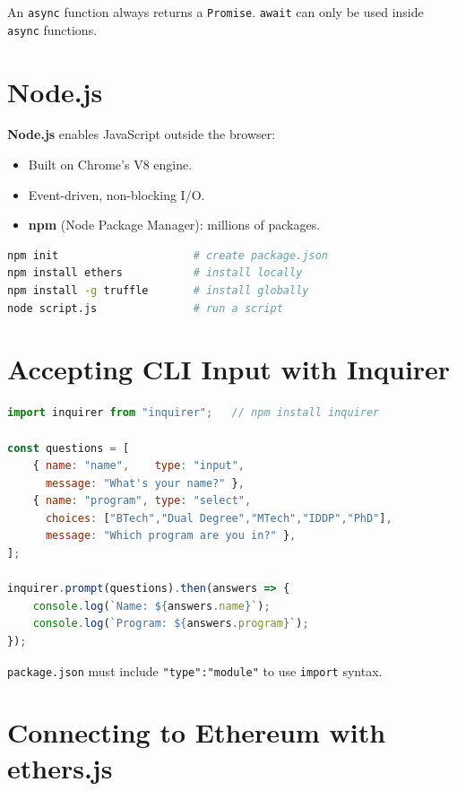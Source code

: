 \documentclass[12pt,a4paper,openany]{book}
\theoremstyle{definition}
\theoremstyle{plain}
\theoremstyle{remark}
\begin{document}
An \texttt{async} function always returns a \texttt{Promise}.
\texttt{await} can only be used inside \texttt{async} functions.

\section{Node.js}

\textbf{Node.js} enables JavaScript outside the browser:
\begin{itemize}
  \item Built on Chrome's V8 engine.
  \item Event-driven, non-blocking I/O.
  \item \textbf{npm} (Node Package Manager): millions of packages.
\end{itemize}

\begin{lstlisting}[language=bash,caption=npm essentials]
npm init                     # create package.json
npm install ethers           # install locally
npm install -g truffle       # install globally
node script.js               # run a script
\end{lstlisting}

\section{Accepting CLI Input with Inquirer}

\begin{lstlisting}[language=JavaScript,caption=inquirer example (main.js)]
import inquirer from "inquirer";   // npm install inquirer

const questions = [
    { name: "name",    type: "input",
      message: "What's your name?" },
    { name: "program", type: "select",
      choices: ["BTech","Dual Degree","MTech","IDDP","PhD"],
      message: "Which program are you in?" },
];

inquirer.prompt(questions).then(answers => {
    console.log(`Name: ${answers.name}`);
    console.log(`Program: ${answers.program}`);
});
\end{lstlisting}

\texttt{package.json} must include \texttt{"type":"module"} to use
\texttt{import} syntax.

\section{Connecting to Ethereum with ethers.js}
\end{document}
